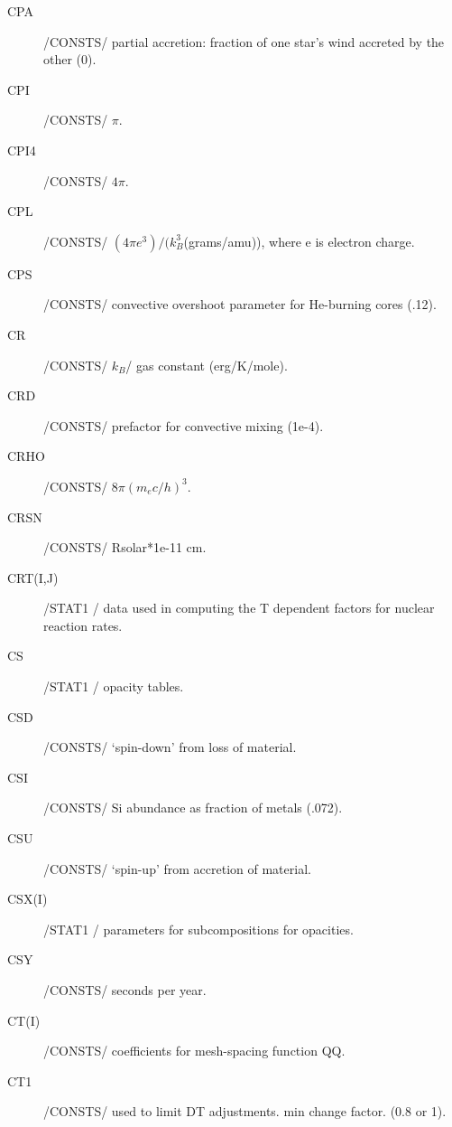 \documentclass{article}
\begin{document}
\begin{description}
	\item[CPA]		    /CONSTS/ partial accretion: fraction of one star's wind accreted by the other (0).

	\item[CPI]		    /CONSTS/ $\pi$.

	\item[CPI4]		/CONSTS/ $4\pi$.

	\item[CPL] 		/CONSTS/ $(4 \pi e^3)/(k_B^3$(grams/amu)), where e is electron charge.

	\item[CPS]		    /CONSTS/ convective overshoot parameter for He-burning cores (.12).

	\item[CR]		    /CONSTS/ $k_B$/ gas constant (erg/K/mole).

	\item[CRD]		    /CONSTS/ prefactor for convective mixing (1e-4).

	\item[CRHO]		/CONSTS/ $8 \pi (m_e c/h)^3$.

	\item[CRSN]		/CONSTS/ Rsolar*1e-11 cm.

	\item[CRT(I,J)]    /STAT1 / data used in computing the T dependent factors for nuclear reaction rates.

	\item[CS]		    /STAT1 / opacity tables.

	\item[CSD]		    /CONSTS/ `spin-down' from loss of material.

	\item[CSI]		    /CONSTS/ Si abundance as fraction of metals (.072).

	\item[CSU	]	    /CONSTS/ `spin-up' from accretion of material.

	\item[CSX(I)]		/STAT1 / parameters for subcompositions for opacities.

	\item[CSY]		    /CONSTS/ seconds per year.

	\item[CT(I)]		/CONSTS/ coefficients for mesh-spacing function QQ.

	\item[CT1]		    /CONSTS/ used to limit DT adjustments.  min change factor. (0.8 or 1).


\end{description}
\end{document}
